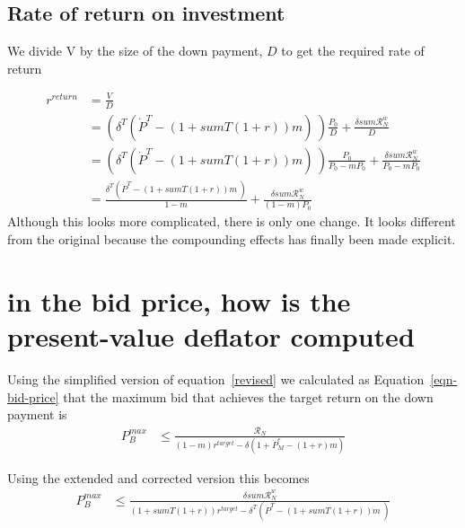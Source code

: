 



\subsection{Rate of return on investment}
We divide V by the size of the down payment, $D$ to get the required rate of return  

\begin{align}
r^{return} 
  &= \frac{V}{D}  \nonumber \\
  &= \left(\delta^T \left(\dot P^T - (1 + sumT(1+r))m\right) \ \right) \frac{P_0}{D}  + \frac{\delta sum\mathcal{R}^w_N}{D}      \nonumber \\
  &= \left(\delta^T \left(\dot P^T - (1 + sumT(1+r))m \right) \ \right)\frac{P_0}{P_0-mP_0} +  \frac{\delta sum\mathcal{R}^w_N }{P_0-mP_0}  \\ 
  &= \frac{\delta^T \left(\dot P^T - (1 + sumT(1+r))m\ \right) }{1-m} +\frac{\delta sum\mathcal{R}^w_N }{(1-m)P_0}\label{revised}
\end{align}
Although this looks more complicated, there is only one change. It looks different from the original because the compounding effects has finally been made explicit.



\section{in the bid price, how is the present-value deflator computed}

Using the simplified version of equation~\ref{revised} we calculated  as Equation~\ref{eqn-bid-price} that the maximum bid that achieves the target return on the down payment is
\begin{align*}
P_B^{max} & \le    \frac{\mathcal{R}_N}{(1-m)r^{target}-\delta \left(1 + \dot P_M^e - (1+r)m\right)}  \end{align*}

Using the extended and corrected version this becomes
\begin{align}
P_B^{max} & \le    \frac{\delta sum\mathcal{R}^w_N } {(1 + sumT(1+r))r^{target}-\delta^T \left(\dot P^T - (1 + sumT(1+r))m\ \right)} \label{eqn-bid-revised} \end{align}

